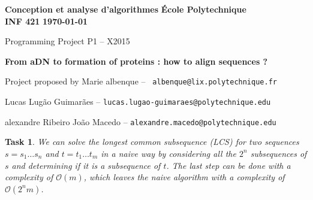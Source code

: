 \documentclass[10pt]{article} %
\theoremstyle{problemstyle}
\newtheorem{exercise}{Task}	%
\renewcommand*{\O}{\mathcal{O}}
\begin{document}
\noindent
\normalsize\textbf{Conception et analyse d'algorithmes} \hfill \textbf{École Polytechnique}\\
\normalsize\textbf{INF 421} \hfill \textbf{\today}\vspace{20pt}
\centerline{\Large Programming Project P1 – X2015}\vspace{5pt}
\centerline{\Large \textbf{From aDN to formation of proteins : how to align sequences ?}}\vspace{3pt}
\centerline{Project proposed by Marie albenque -- \texttt{ albenque@lix.polytechnique.fr}}\vspace{13pt}
\centerline{Lucas Lugão Guimarães -- \texttt{lucas.lugao-guimaraes@polytechnique.edu}}
\centerline{alexandre Ribeiro João Macedo --  \texttt{alexandre.macedo@polytechnique.edu}}\vspace{20pt}


\begin{exercise} %
We can solve the longest common subsequence (LCS) for two sequences $s=s_1\dots s_n$ and $t=t_1\dots t_m$ in a naive way by considering all the $2^{n}$ subsequences of $s$ and determining if it is a subsequence of $t$. The last step can be done with a complexity of $\O(m)$, which leaves the naive algorithm with a complexity of $\O(2^{n}m)$.
\end{exercise}
\end{document}
